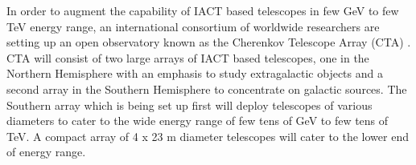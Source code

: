 \documentclass[preprint,12pt]{elsarticle}
\begin{document}
In order to augment the capability of IACT based telescopes in few GeV to few 
TeV energy range, an international consortium of 
worldwide researchers are setting up an open observatory known as the Cherenkov 
Telescope Array (CTA) \cite{expacta2011}. CTA will consist of two large arrays 
of IACT based telescopes, one in the Northern Hemisphere with 
an emphasis to study  extragalactic objects and a second array in the Southern 
Hemisphere to concentrate on galactic sources. The Southern array which is being 
set up first will deploy telescopes of various diameters 
to cater to the wide energy range of few tens of GeV to 
few tens of TeV. A compact array 
of 4 x 23 m diameter telescopes will cater to the lower end of energy range. 

%
\end{document}
